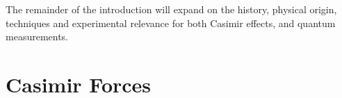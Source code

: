The remainder of the introduction will expand on the history, physical origin, techniques and experimental 
relevance for both Casimir effects, and quantum measurements.  



\section{Casimir Forces}%

